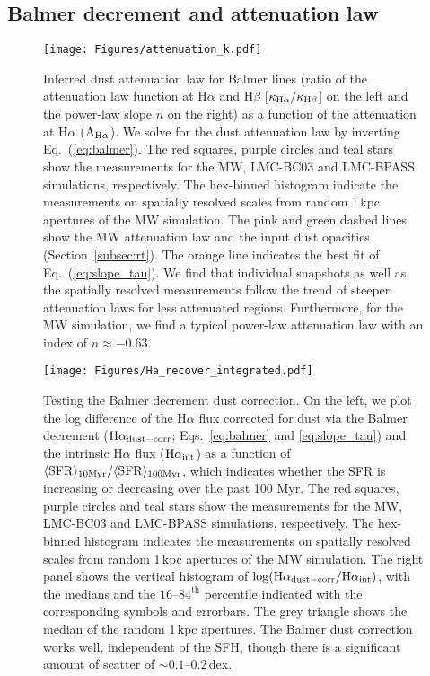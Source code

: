 \documentclass[fleqn,usenatbib]{mnras}
\begin{document}
\subsection{Balmer decrement and attenuation law}
\label{subsec:dust}


\begin{figure}
\texttt{[image: Figures/attenuation\_k.pdf]}
\caption{Inferred dust attenuation law for Balmer lines (ratio of the attenuation law function at H$\alpha$ and H$\beta$ [$\kappa_{\rm H\alpha}/\kappa_{\rm H\beta}$] on the left and the power-law slope $n$ on the right) as a function of the attenuation at H$\alpha$ ($\mathrm{A}_{\rm H\alpha}$). We solve for the dust attenuation law by inverting Eq.~(\ref{eq:balmer}). The red squares, purple circles and teal stars show the measurements for the MW, LMC-BC03 and LMC-BPASS simulations, respectively. The hex-binned histogram indicate the measurements on spatially resolved scales from random 1\,kpc apertures of the MW simulation. The pink and green dashed lines show the MW attenuation law and the input dust opacities (Section~\ref{subsec:rt}). The orange line indicates the best fit of Eq.~(\ref{eq:slope_tau}). We find that individual snapshots as well as the spatially resolved measurements follow the trend of steeper attenuation laws for less attenuated regions. Furthermore, for the MW simulation, we find a typical power-law attenuation law with an index of $n\approx-0.63$.}
\label{fig:attenuation}
\end{figure}

\begin{figure}
\texttt{[image: Figures/Ha\_recover\_integrated.pdf]}
\caption{Testing the Balmer decrement dust correction. On the left, we plot the log difference of the H$\alpha$ flux corrected for dust via the Balmer decrement ($\mathrm{H}\alpha_{\rm dust-corr}$; Eqs.~\ref{eq:balmer} and \ref{eq:slope_tau}) and the intrinsic H$\alpha$ flux ($\mathrm{H}\alpha_{\rm int}$) as a function of $\langle\mathrm{SFR}\rangle_{\rm 10Myr}/\langle\mathrm{SFR}\rangle_{\rm 100Myr}$, which indicates whether the SFR is increasing or decreasing over the past 100 Myr. The red squares, purple circles and teal stars show the measurements for the MW, LMC-BC03 and LMC-BPASS simulations, respectively. The hex-binned histogram indicates the measurements on spatially resolved scales from random 1\,kpc apertures of the MW simulation. The right panel shows the vertical histogram of $\log(\mathrm{H}\alpha_{\rm dust-corr}/\mathrm{H}\alpha_{\rm int})$, with the medians and the $16$--$84^\text{th}$ percentile indicated with the corresponding symbols and errorbars. The grey triangle shows the median of the random 1\,kpc apertures. The Balmer dust correction works well, independent of the SFH, though there is a significant amount of scatter of $\sim0.1$--$0.2$\,dex.}
\label{fig:dust_correction}
\end{figure}
\end{document}

